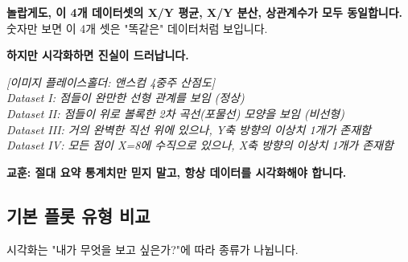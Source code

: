\documentclass[11pt,a4paper]{book}
\theoremstyle{definition}
\begin{document}
\begin{warningbox}
\textbf{놀랍게도, 이 4개 데이터셋의 X/Y 평균, X/Y 분산, 상관계수가 모두 동일합니다.}
숫자만 보면 이 4개 셋은 "똑같은" 데이터처럼 보입니다.

\textbf{하지만 시각화하면 진실이 드러납니다.}

\begin{center}
    \textit{[이미지 플레이스홀더: 앤스컴 4중주 산점도]} \\
    \textit{Dataset I: 점들이 완만한 선형 관계를 보임 (정상)} \\
    \textit{Dataset II: 점들이 위로 볼록한 2차 곡선(포물선) 모양을 보임 (비선형)} \\
    \textit{Dataset III: 거의 완벽한 직선 위에 있으나, Y축 방향의 이상치 1개가 존재함} \\
    \textit{Dataset IV: 모든 점이 X=8에 수직으로 있으나, X축 방향의 이상치 1개가 존재함}
\end{center}

\textbf{교훈: 절대 요약 통계치만 믿지 말고, 항상 데이터를 시각화해야 합니다.}
\end{warningbox}

\subsection{기본 플롯 유형 비교}

시각화는 "내가 무엇을 보고 싶은가?"에 따라 종류가 나뉩니다.
\end{document}
